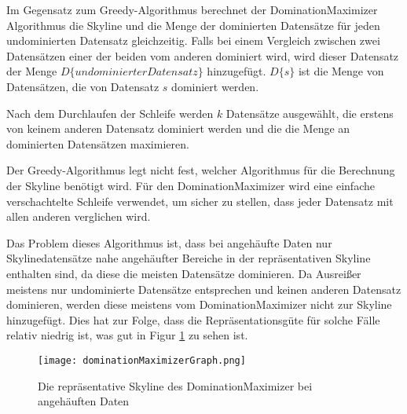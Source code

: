 Im Gegensatz zum Greedy-Algorithmus berechnet der DominationMaximizer Algorithmus die Skyline und die Menge der dominierten Datensätze für jeden undominierten Datensatz gleichzeitig. Falls bei einem Vergleich zwischen zwei Datensätzen einer der beiden vom anderen dominiert wird, wird dieser Datensatz der Menge $D\{undominierter Datensatz\}$ hinzugefügt. $D\{s\}$ ist die Menge von Datensätzen, die von Datensatz $s$ dominiert werden. 

Nach dem Durchlaufen der Schleife werden $k$ Datensätze ausgewählt, die erstens von keinem anderen Datensatz dominiert werden und die die Menge an dominierten Datensätzen maximieren.

Der Greedy-Algorithmus legt nicht fest, welcher Algorithmus für die Berechnung der Skyline benötigt wird. Für den DominationMaximizer wird eine einfache verschachtelte Schleife verwendet, um sicher zu stellen, dass jeder Datensatz mit allen anderen verglichen wird. 

Das Problem dieses Algorithmus ist, dass bei angehäufte Daten nur Skylinedatensätze nahe angehäufter Bereiche in der repräsentativen Skyline enthalten sind, da diese die meisten Datensätze dominieren. Da Ausreißer meistens nur undominierte Datensätze entsprechen und keinen anderen Datensatz dominieren, werden diese meistens vom DominationMaximizer nicht zur Skyline hinzugefügt.  Dies hat zur Folge, dass die Repräsentationsgüte für solche Fälle relativ niedrig ist, was gut in Figur \ref{img:dominationMaximizerGraph} zu sehen ist.
 
\begin{figure}[H]
	\centering
	\texttt{[image: dominationMaximizerGraph.png]}
	\caption{Die repräsentative Skyline des DominationMaximizer bei angehäuften Daten}
	\label{img:dominationMaximizerGraph}
\end{figure}
